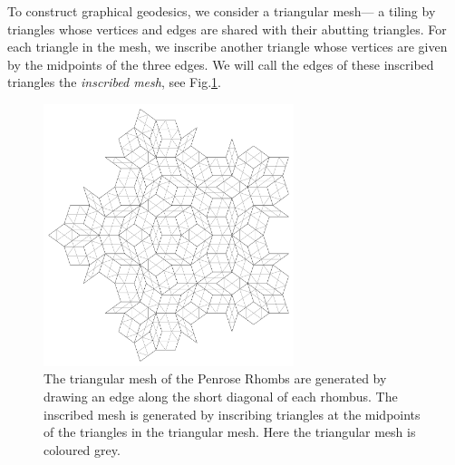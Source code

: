 \documentclass[
  oneside,
  11pt, a4paper,
  footinclude=true,
  headinclude=true,
  cleardoublepage=empty
]{scrbook}
\begin{document}
To construct graphical geodesics, we consider a triangular mesh--- a tiling by triangles whose vertices and edges are shared with their abutting triangles. For each triangle in the mesh, we inscribe another triangle whose vertices are given by the midpoints of the three edges. We will call the edges of these inscribed triangles the \textit{inscribed mesh}, see Fig.\ref{fig:inscribedmesh}.
\begin{figure}[H]
\centering
\includegraphics[width=0.65\textwidth]{InscribedMesh}
\caption[Inscribed Mesh]{The triangular mesh of the Penrose Rhombs are generated by drawing an edge along the short diagonal of each rhombus. The inscribed mesh is generated by inscribing triangles at the midpoints of the triangles in the triangular mesh. Here the triangular mesh is coloured grey.}
\label{fig:inscribedmesh}
\end{figure}
\end{document}

